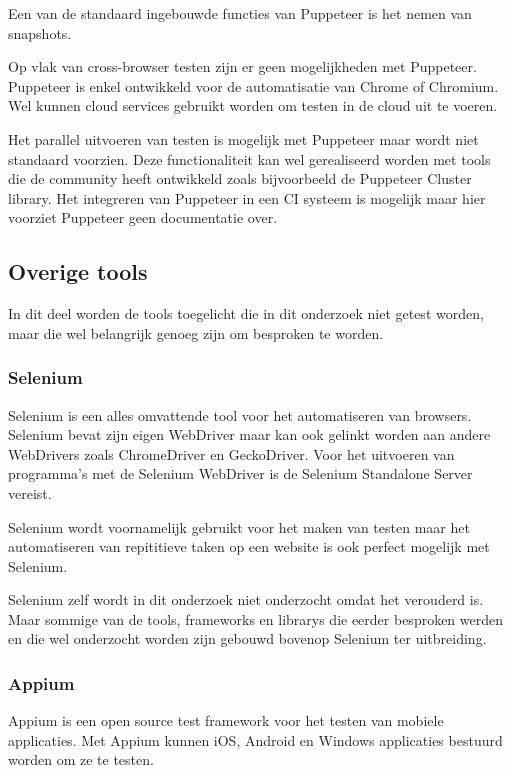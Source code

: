 Een van de standaard ingebouwde functies van Puppeteer is het nemen van \glspl{snapshot}.

Op vlak van cross-browser testen zijn er geen mogelijkheden met Puppeteer. Puppeteer is enkel ontwikkeld voor de automatisatie van Chrome of Chromium. Wel kunnen cloud services gebruikt worden om testen in de cloud uit te voeren.

Het parallel uitvoeren van testen is mogelijk met Puppeteer maar wordt niet standaard voorzien. Deze functionaliteit kan wel gerealiseerd worden met \glspl{tool} die de community heeft ontwikkeld zoals bijvoorbeeld de Puppeteer Cluster \gls{library}. Het integreren van Puppeteer in een \gls{CI} systeem is mogelijk maar hier voorziet Puppeteer geen documentatie over.

\subsection{Overige tools}
In dit deel worden de \glspl{tool} toegelicht die in dit onderzoek niet getest worden, maar die wel belangrijk genoeg zijn om besproken te worden.

\subsubsection{Selenium}
Selenium is een alles omvattende \gls{tool} voor het automatiseren van browsers. Selenium bevat zijn eigen \gls{WebDriver} maar kan ook gelinkt worden aan andere \glspl{WebDriver} zoals ChromeDriver en GeckoDriver. Voor het uitvoeren van programma's met de Selenium \gls{WebDriver} is de Selenium Standalone Server vereist.

Selenium wordt voornamelijk gebruikt voor het maken van testen maar het automatiseren van repititieve taken op een website is ook perfect mogelijk met Selenium.

Selenium zelf wordt in dit onderzoek niet onderzocht omdat het verouderd is. Maar sommige van de \glspl{tool}, \glspl{framework} en \glspl{library} die eerder besproken werden en die wel onderzocht worden zijn gebouwd bovenop Selenium ter uitbreiding.

\clearpage
\subsubsection{Appium}
Appium is een open source test \gls{framework} voor het testen van mobiele applicaties. Met Appium kunnen  iOS, Android en Windows applicaties bestuurd worden om ze te testen.

